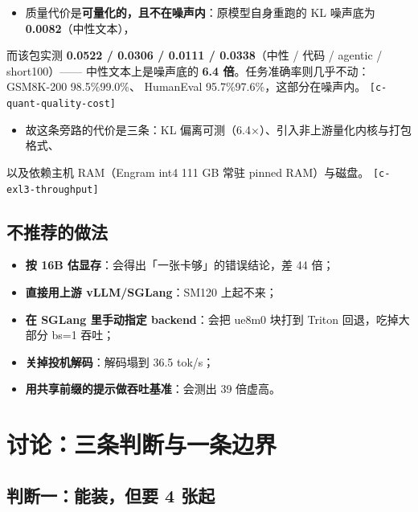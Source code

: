 \begin{itemize}
  \item 质量代价是\textbf{可量化的，且不在噪声内}：原模型自身重跑的 KL 噪声底为 \textbf{0.0082}（中性文本），
\end{itemize}
  而该包实测 \textbf{0.0522 / 0.0306 / 0.0111 / 0.0338}（中性 / 代码 / agentic / short100）——  中性文本上是噪声底的 \textbf{6.4 倍}。任务准确率则几乎不动：GSM8K-200 98.5\%99.0\%、  HumanEval 95.7\%97.6\%，这部分在噪声内。 {\scriptsize\texttt{[c-\hspace{0pt}quant-\hspace{0pt}quality-\hspace{0pt}cost]}}

\begin{itemize}
  \item 故这条旁路的代价是三条：KL 偏离可测（6.4×）、引入非上游量化内核与打包格式、
\end{itemize}
  以及依赖主机 RAM（Engram int4 111 GB 常驻 pinned RAM）与磁盘。 {\scriptsize\texttt{[c-\hspace{0pt}exl3-\hspace{0pt}throughput]}}


\subsection{不推荐的做法}

\begin{itemize}
  \item \textbf{按 16B 估显存}：会得出「一张卡够」的错误结论，差 44 倍；
  \item \textbf{直接用上游 vLLM/SGLang}：SM120 上起不来；
  \item \textbf{在 SGLang 里手动指定 backend}：会把 ue8m0 块打到 Triton 回退，吃掉大部分 bs=1 吞吐；
  \item \textbf{关掉投机解码}：解码塌到 36.5 tok/s；
  \item \textbf{用共享前缀的提示做吞吐基准}：会测出 39 倍虚高。
\end{itemize}


\section{讨论：三条判断与一条边界}

\subsection{判断一：能装，但要 4 张起}

